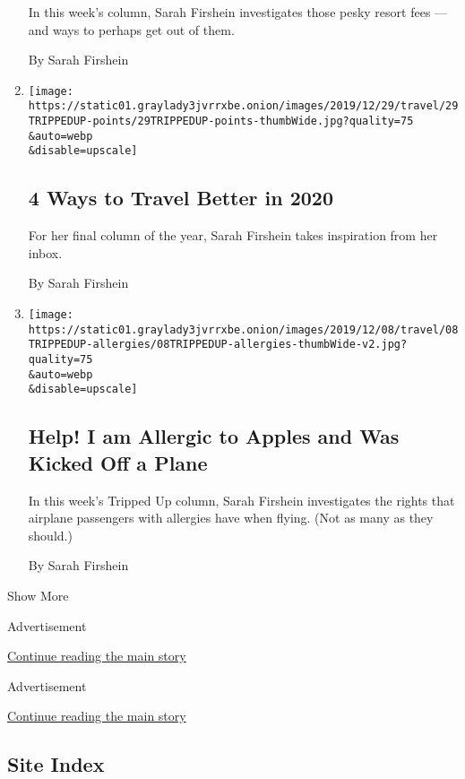 \begin{enumerate}
  In this week's column, Sarah Firshein investigates those pesky resort
  fees --- and ways to perhaps get out of them.

  By Sarah Firshein
\item
  \href{/2019/12/28/travel/4-ways-to-travel-better-in-2020.html}{}

  \texttt{[image: https://static01.graylady3jvrrxbe.onion/images/2019/12/29/travel/29TRIPPEDUP-points/29TRIPPEDUP-points-thumbWide.jpg?quality=75\\\&auto=webp\\\&disable=upscale]}

  \hypertarget{4-ways-to-travel-better-in-2020}{%
  \subsection{4 Ways to Travel Better in
  2020}\label{4-ways-to-travel-better-in-2020}}

  For her final column of the year, Sarah Firshein takes inspiration
  from her inbox.

  By Sarah Firshein
\item
  \href{/2019/12/07/travel/allergies-airplane.html}{}

  \texttt{[image: https://static01.graylady3jvrrxbe.onion/images/2019/12/08/travel/08TRIPPEDUP-allergies/08TRIPPEDUP-allergies-thumbWide-v2.jpg?quality=75\\\&auto=webp\\\&disable=upscale]}

  \hypertarget{help-i-am-allergic-to-apples-and-was-kicked-off-a-plane}{%
  \subsection{Help! I am Allergic to Apples and Was Kicked Off a
  Plane}\label{help-i-am-allergic-to-apples-and-was-kicked-off-a-plane}}

  In this week's Tripped Up column, Sarah Firshein investigates the
  rights that airplane passengers with allergies have when flying. (Not
  as many as they should.)

  By Sarah Firshein
\end{enumerate}

Show More

Advertisement

\protect\hyperlink{after-mid1}{Continue reading the main story}

Advertisement

\protect\hyperlink{after-mktg}{Continue reading the main story}

\hypertarget{site-index}{%
\subsection{Site Index}\label{site-index}}

